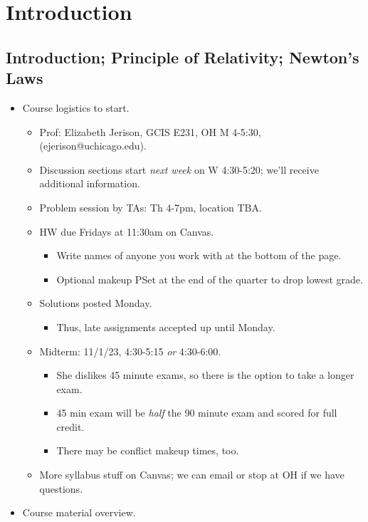 \documentclass[../notes.tex]{subfiles}
\begin{document}
\chapter{Introduction}
\section{Introduction; Principle of Relativity; Newton's Laws}
\begin{itemize}
    \item {}Course logistics to start.
    \begin{itemize}
        \item Prof: Elizabeth Jerison, GCIS E231, OH M 4-5:30, (ejerison@uchicago.edu).
        \item Discussion sections start \emph{next week} on W 4:30-5:20; we'll receive additional information.
        \item Problem session by TAs: Th 4-7pm, location TBA.
        \item HW due Fridays at 11:30am on Canvas.
        \begin{itemize}
            \item Write names of anyone you work with at the bottom of the page.
            \item Optional makeup PSet at the end of the quarter to drop lowest grade.
        \end{itemize}
        \item Solutions posted Monday.
        \begin{itemize}
            \item Thus, late assignments accepted up until Monday.
        \end{itemize}
        \item Midterm: 11/1/23, 4:30-5:15 \emph{or} 4:30-6:00.
        \begin{itemize}
            \item She dislikes 45 minute exams, so there is the option to take a longer exam.
            \item 45 min exam will be \emph{half} the 90 minute exam and scored for full credit.
            \item There may be conflict makeup times, too.
        \end{itemize}
        \item More syllabus stuff on Canvas; we can email or stop at OH if we have questions.
    \end{itemize}
    \item Course material overview.

\end{itemize}
\end{document}
